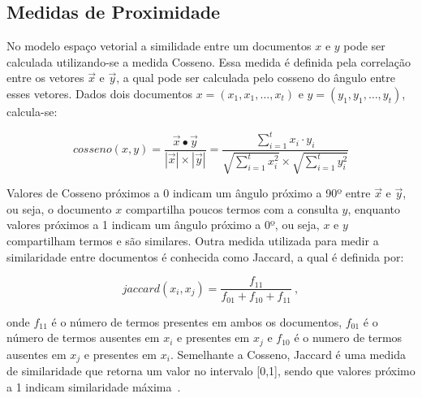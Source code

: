 
\subsection*{Medidas de Proximidade}
\label{subsec:MedidasProximidade}
No modelo espaço vetorial a similidade entre um documentos $x$ e $y$ pode ser calculada utilizando-se a medida Cosseno. Essa medida é definida pela correlação entre os vetores $\vec{x}$ e $\vec{y}$, a qual pode ser calculada pelo cosseno do  ângulo entre esses vetores. Dados dois documentos $x = (x_1, x_1, \dots, x_t)$ e $y = (y_1, y_1, \dots, y_t)$, calcula-se: 




\begin{equation}
cosseno(x, y) = \frac{ \vec{x} \bullet \vec{y} }
                   { |\vec{x}| \times | \vec{y}|}
            = \frac{ \sum_{i=1}^{t} x_i \cdot y_i}
                   { \sqrt{\sum_{i=1}^{t} x_i^2} \times \sqrt{\sum_{i=1}^{t} y_i^2 } }                      \label{equ:cosine}
\end{equation} 


Valores de Cosseno próximos a 0 indicam um ângulo próximo a 90º entre $\vec{x}$ e $\vec{y}$, ou seja, o documento $x$ compartilha poucos termos com a consulta $y$, enquanto valores próximos a 1 indicam um ângulo próximo a 0º, ou seja, $x$ e $y$ compartilham termos e são similares.
%
Outra medida utilizada para medir a similaridade entre documentos é conhecida como Jaccard, a qual é definida por:

\begin{equation}
jaccard(x_i, x_j) = \frac{f_{11}}{f_{01} + f_{10} + f_{11}}~,
\end{equation}

\noindent
onde 
$f_{11}$ é o número de termos presentes em ambos os documentos,
$f_{01}$ é o número de termos ausentes em $x_i$ e presentes em $x_j$ e
$f_{10}$ é o numero de termos ausentes em $x_j$ e presentes em $x_i$.
%
Semelhante a Cosseno, Jaccard é uma medida de similaridade que retorna um valor no intervalo [0,1], sendo que valores próximo a 1 indicam similaridade máxima~\cite{Tan2005,Feldman2006}.
